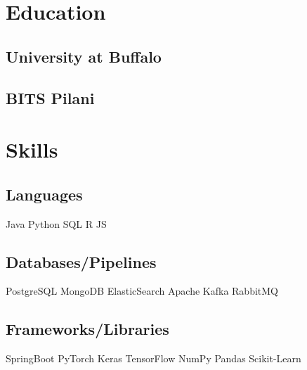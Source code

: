 \documentclass[]{plushcv}
\begin{document}
\hfill
\begin{minipage}[t]{0.25\textwidth} 
	
	
	\section{Education} 
	
	\subsection{University at Buffalo}
	\sectionsep
	
	\subsection{BITS Pilani}
	\sectionsep
	
	
	\section{Skills}
	\subsection{Languages}
	\sectionsep
	Java \textbullet{} Python \textbullet{} SQL \textbullet{} R \textbullet{} JS\\
	\sectionsep
	\sectionsep
	
	\subsection{Databases/Pipelines}
	\sectionsep
	PostgreSQL \textbullet{} MongoDB \textbullet{} ElasticSearch \textbullet{} Apache Kafka \textbullet{} RabbitMQ \\
	\sectionsep
	\sectionsep
	
	\subsection{Frameworks/Libraries}
	\sectionsep
	SpringBoot \textbullet{} PyTorch \textbullet{} Keras \textbullet{} TensorFlow \textbullet{} NumPy \textbullet{} Pandas \textbullet{} Scikit-Learn\\
	\sectionsep
	

\end{minipage}
\end{document}
